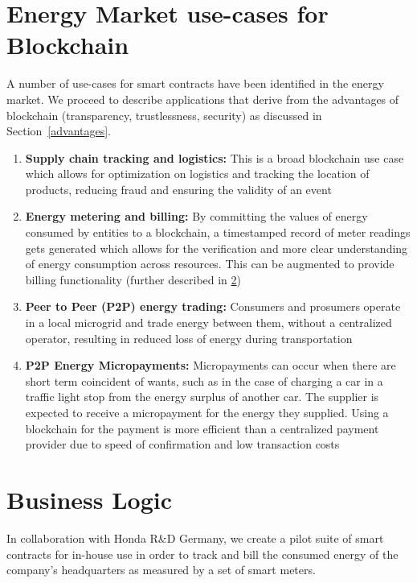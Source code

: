 \section{Energy Market use-cases for Blockchain}

A number of use-cases for smart contracts have been identified in the energy market. We proceed to describe applications that derive from the advantages of blockchain (transparency, trustlessness, security) as discussed in Section~\ref{advantages}.

\begin{enumerate}
    \item \textbf{Supply chain tracking and logistics:} This is a broad blockchain use case which allows for optimization on logistics and tracking the location of products, reducing fraud and ensuring the validity of an event
    \item \textbf{Energy metering and billing:} By committing the values of energy consumed by entities to a blockchain, a timestamped record of meter readings gets generated which allows for the verification and more clear understanding of energy consumption across resources. This can be augmented to provide billing functionality (further described in \ref{business-logic})
    \item \textbf{Peer to Peer (P2P) energy trading:} Consumers and prosumers operate in a local microgrid and trade energy between them, without a centralized operator, resulting in reduced loss of energy during transportation
    \item \textbf{P2P Energy Micropayments:} Micropayments can occur when there are short term coincident of wants, such as in the case of charging a car in a traffic light stop from the energy surplus of another car. The supplier is expected to receive a micropayment for the energy they supplied. Using a blockchain for the payment is more efficient than a centralized payment provider due to speed of confirmation and low transaction costs
\end{enumerate}

\section{Business Logic} \label{business-logic}

In collaboration with Honda R\&D Germany, we create a pilot suite of smart contracts for in-house use in order to track and bill the consumed energy of the company's headquarters as measured by a set of smart meters. 

